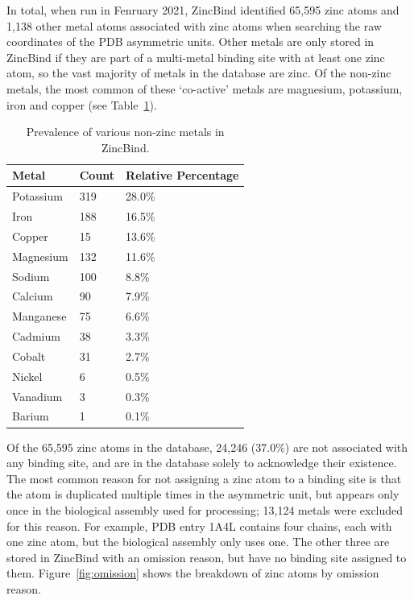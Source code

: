 In total, when run in Fenruary 2021, ZincBind identified 65,595 zinc atoms and 1,138 other metal atoms associated with zinc atoms when searching the raw coordinates of the PDB asymmetric units. Other metals are only stored in ZincBind if they are part of a multi-metal binding site with at least one zinc atom, so the vast majority of metals in the database are zinc. Of the non-zinc metals, the most common of these `co-active' metals are magnesium, potassium, iron and copper (see Table~\ref{tab:metalcount}).

\begin{table}
  \caption{\label{tab:metalcount}Prevalence of various non-zinc metals in ZincBind.}
\begin{center}
\begin{tabular}{lll} \hline
Metal & Count & Relative Percentage  \\ \hline
Potassium & 319   & 28.0\% \\
Iron      & 188   & 16.5\% \\
Copper    & 15    & 13.6\% \\
Magnesium & 132   & 11.6\% \\
Sodium    & 100   & 8.8\%  \\ 
Calcium   & 90    & 7.9\%  \\
Manganese & 75    & 6.6\%  \\
Cadmium   & 38    & 3.3\%  \\
Cobalt    & 31    & 2.7\%  \\
Nickel    & 6     & 0.5\%  \\
Vanadium  & 3     & 0.3\%  \\
Barium    & 1     & 0.1\%  \\ \hline
\end{tabular}
\end{center}
\end{table}

Of the 65,595 zinc atoms in the database, 24,246 (37.0\%) are not associated with any binding site, and are in the database solely to acknowledge their existence. The most common reason for not assigning a zinc atom to a binding site is that the atom is duplicated multiple times in the asymmetric unit, but appears only once in the biological assembly used for processing; 13,124 metals were excluded for this reason. For example, PDB entry 1A4L contains four chains, each with one zinc atom, but the biological assembly only uses one. The other three are stored in ZincBind with an omission reason, but have no binding site assigned to them. Figure~\ref{fig:omission} shows the breakdown of zinc atoms by omission reason.

